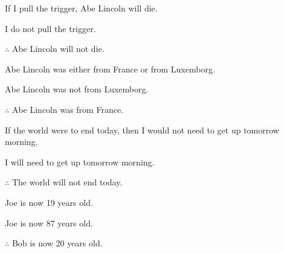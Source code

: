 \begin{earg}
\item If I pull the trigger, Abe Lincoln will die.
\item I do not pull the trigger.
\item[$\therefore$] Abe Lincoln will not die. \hfill {}
\end{earg}

\begin{earg}
\item Abe Lincoln was either from France or from Luxemborg.
\item Abe Lincoln was not from Luxemborg.
\item[$\therefore$] Abe Lincoln was from France. \hfill {}
\end{earg}

\begin{earg}
\item If the world were to end today, then I would not need to get up tomorrow morning.
\item I will need to get up tomorrow morning.
\item[$\therefore$] The world will not end today. \hfill {}
\end{earg}

\begin{earg}
\item Joe is now 19 years old.
\item Joe is now 87 years old.
\item[$\therefore$] Bob is now 20 years old. \hfill {}
\\
\end{earg}

